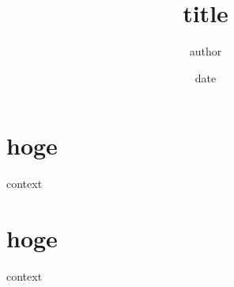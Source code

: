 \documentclass[a4paper,11pt,titlepage]{jsarticle}
\title{title}
\author{author}
\date{date}
\begin{document}
   \maketitle

   \section{hoge}
   context

   \section{hoge}
   context
\end{document}
